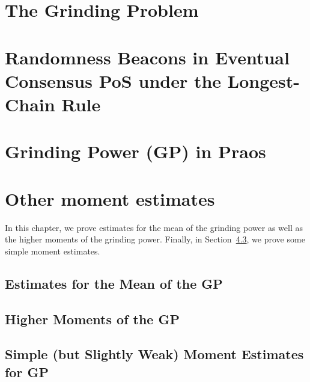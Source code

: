 


\chapter{The Grinding Problem}\label{sec:grinding-intro}


\chapter{Randomness Beacons in Eventual Consensus PoS under the Longest-Chain Rule}\label{sec:model-grinding}


% 

\chapter{Grinding Power (GP) in Praos}\label{sec:praos}


% 




\chapter{Other moment estimates}\label{sec:praos-other-moments}
In this chapter, 
we prove estimates for the mean of the grinding power 
as well as the higher moments of the grinding power. 
Finally, in Section~\ref{sec:praos-simple-moments}, 
we prove some simple moment estimates.

\section{Estimates for the Mean of the GP}\label{sec:praos-mean}



\section{Higher Moments of the GP}\label{sec:praos-higher-moments}



\section{Simple (but Slightly Weak) Moment Estimates for GP}\label{sec:praos-simple-moments}



